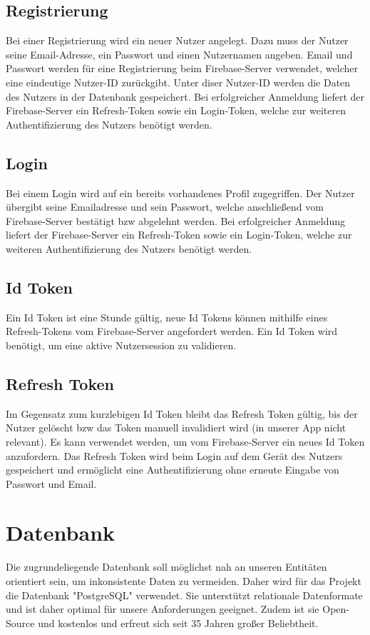 \documentclass{entwurfsheft}
\begin{document}
\subsection{Registrierung}
Bei einer Registrierung wird ein neuer Nutzer angelegt. Dazu muss der Nutzer seine Email-Adresse, ein Passwort und einen Nutzernamen angeben. Email und Passwort werden für eine Registrierung beim Firebase-Server verwendet, welcher eine eindeutige Nutzer-ID zurückgibt. Unter diser Nutzer-ID werden die Daten des Nutzers in der Datenbank gespeichert. Bei erfolgreicher Anmeldung liefert der Firebase-Server ein Refresh-Token sowie ein Login-Token, welche zur weiteren Authentifizierung des Nutzers benötigt werden.

\subsection{Login}
Bei einem Login wird auf ein bereits vorhandenes Profil zugegriffen. Der Nutzer übergibt seine Emailadresse und sein Passwort, welche anschließend vom Firebase-Server bestätigt bzw abgelehnt werden. Bei erfolgreicher Anmeldung liefert der Firebase-Server ein Refresh-Token sowie ein Login-Token, welche zur weiteren Authentifizierung des Nutzers benötigt werden.

\subsection{Id Token}
Ein Id Token ist eine Stunde gültig, neue Id Tokens können mithilfe eines Refresh-Tokens vom Firebase-Server angefordert werden. Ein Id Token wird benötigt, um eine aktive Nutzersession zu validieren.

\subsection{Refresh Token}
Im Gegensatz zum kurzlebigen Id Token bleibt das Refresh Token gültig, bis der Nutzer gelöscht bzw das Token manuell invalidiert wird (in unserer App nicht relevant). Es kann verwendet werden, um vom Firebase-Server ein neues Id Token anzufordern. Das Refresh Token wird beim Login auf dem Gerät des Nutzers gespeichert und ermöglicht eine Authentifizierung ohne erneute Eingabe von Passwort und Email. 

\newpage

\section{Datenbank}
Die zugrundeliegende Datenbank soll möglichst nah an unseren Entitäten orientiert sein, um inkonsistente Daten zu vermeiden. Daher wird für das Projekt die Datenbank "PostgreSQL" verwendet. Sie unterstützt relationale Datenformate und ist daher optimal für unsere Anforderungen geeignet. Zudem ist sie Open-Source und kostenlos und erfreut sich seit 35 Jahren großer Beliebtheit.
\end{document}
